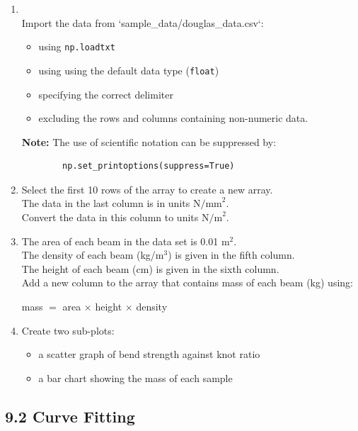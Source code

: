 \documentclass[11pt]{report}
\begin{document}
\begin{enumerate}[label=(\Alph*)]
    
    \item   \\
    Import the data from `sample\_data/douglas\_data.csv`:
    \begin{itemize}
        \item using {\tt np.loadtxt}
        \item using using the default data type ({\tt float})
        \item specifying the correct delimiter
        \item excluding the rows and columns containing non-numeric data.
    \end{itemize}
    {\bf Note:} The use of scientific notation can be suppressed by:
    \begin{verbatim}
        np.set_printoptions(suppress=True)
    \end{verbatim}
    
    \item Select the first 10 rows of the array to create a new array.\\
    The data in the last column is in units $\mathrm{N/mm}^2$.\\
    Convert the data in this column to units $\mathrm{N/m}^2$.\\

    \item The area of each beam in the data set is 0.01 $\mathrm{m^2}$.\\
    The density of each beam (kg/m$^3$) is given in the fifth column. \\
    The height of each beam (cm) is given in the sixth column. \\
    Add a new column to the array that contains mass of each beam (kg) using:

    mass $=$ area $\times$ height $\times$ density
    
    \item Create two sub-plots:
    \begin{itemize}
        \item a scatter graph of  bend strength against knot ratio 
        \item a bar chart showing the mass of each sample
    \end{itemize}

\end{enumerate}

\subsection*{\Large 9.2 Curve Fitting}
\end{document}
